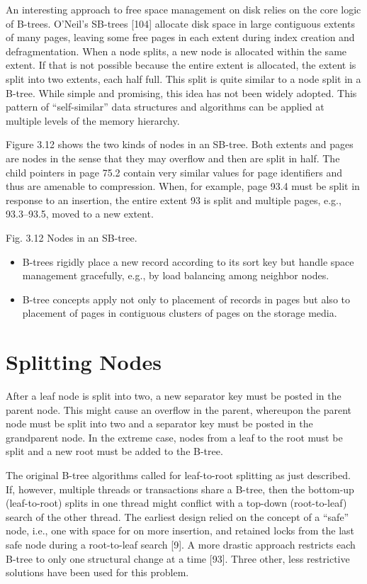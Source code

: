 An interesting approach to free space management on disk relies on the
core logic of B-trees. O'Neil's SB-trees {[}104{]} allocate disk space
in large contiguous extents of many pages, leaving some free pages in
each extent during index creation and defragmentation. When a node
splits, a new node is allocated within the same extent. If that is not
possible because the entire extent is allocated, the extent is split
into two extents, each half full. This split is quite similar to a node
split in a B-tree. While simple and promising, this idea has not been
widely adopted. This pattern of ``self-similar'' data structures and
algorithms can be applied at multiple levels of the memory hierarchy.

Figure 3.12 shows the two kinds of nodes in an SB-tree. Both extents and
pages are nodes in the sense that they may overflow and then are split
in half. The child pointers in page 75.2 contain very similar values for
page identifiers and thus are amenable to compression. When, for
example, page 93.4 must be split in response to an insertion, the entire
extent 93 is split and multiple pages, e.g., 93.3--93.5, moved to a new
extent.

Fig. 3.12 Nodes in an SB-tree.

\begin{itemize}
\item
  B-trees rigidly place a new record according to its sort key but
  handle space management gracefully, e.g., by load balancing among
  neighbor nodes.
\item
  B-tree concepts apply not only to placement of records in pages but
  also to placement of pages in contiguous clusters of pages on the
  storage media.
\end{itemize}

\hypertarget{splitting-nodes}{%
\section{Splitting Nodes}\label{splitting-nodes}}

After a leaf node is split into two, a new separator key must be posted
in the parent node. This might cause an overflow in the parent,
whereupon the parent node must be split into two and a separator key
must be posted in the grandparent node. In the extreme case, nodes from
a leaf to the root must be split and a new root must be added to the
B-tree.

The original B-tree algorithms called for leaf-to-root splitting as just
described. If, however, multiple threads or transactions share a B-tree,
then the bottom-up (leaf-to-root) splits in one thread might conflict
with a top-down (root-to-leaf) search of the other thread. The earliest
design relied on the concept of a ``safe'' node, i.e., one with space
for on more insertion, and retained locks from the last safe node during
a root-to-leaf search {[}9{]}. A more drastic approach restricts each
B-tree to only one structural change at a time {[}93{]}. Three other,
less restrictive solutions have been used for this problem.

